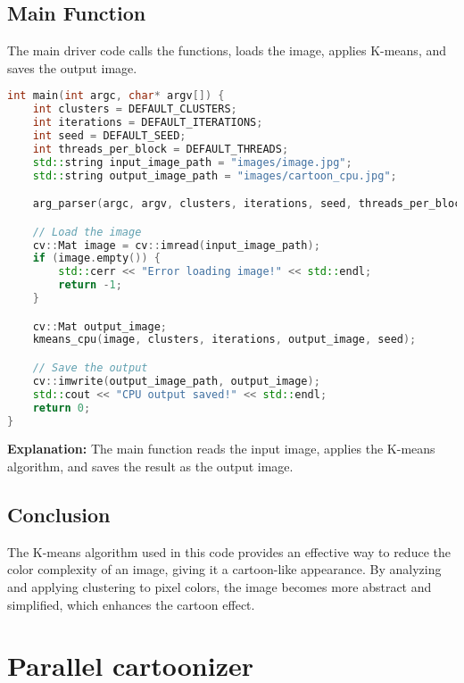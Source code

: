 \subsection{Main Function}
The main driver code calls the functions, loads the image, applies K-means, and saves the output image.

\begin{lstlisting}[language=C++]
int main(int argc, char* argv[]) {
    int clusters = DEFAULT_CLUSTERS;
    int iterations = DEFAULT_ITERATIONS;
    int seed = DEFAULT_SEED;
    int threads_per_block = DEFAULT_THREADS;
    std::string input_image_path = "images/image.jpg";
    std::string output_image_path = "images/cartoon_cpu.jpg";

    arg_parser(argc, argv, clusters, iterations, seed, threads_per_block, input_image_path, output_image_path);

    // Load the image
    cv::Mat image = cv::imread(input_image_path);
    if (image.empty()) {
        std::cerr << "Error loading image!" << std::endl;
        return -1;
    }

    cv::Mat output_image;
    kmeans_cpu(image, clusters, iterations, output_image, seed);

    // Save the output
    cv::imwrite(output_image_path, output_image);
    std::cout << "CPU output saved!" << std::endl;
    return 0;
}
\end{lstlisting}

\textbf{Explanation:}
The main function reads the input image, applies the K-means algorithm, and saves the result as the output image.

\subsection{Conclusion}
The K-means algorithm used in this code provides an effective way to reduce the color complexity of an image, giving it a cartoon-like appearance. By analyzing and applying clustering to pixel colors, the image becomes more abstract and simplified, which enhances the cartoon effect.



\section{Parallel cartoonizer}